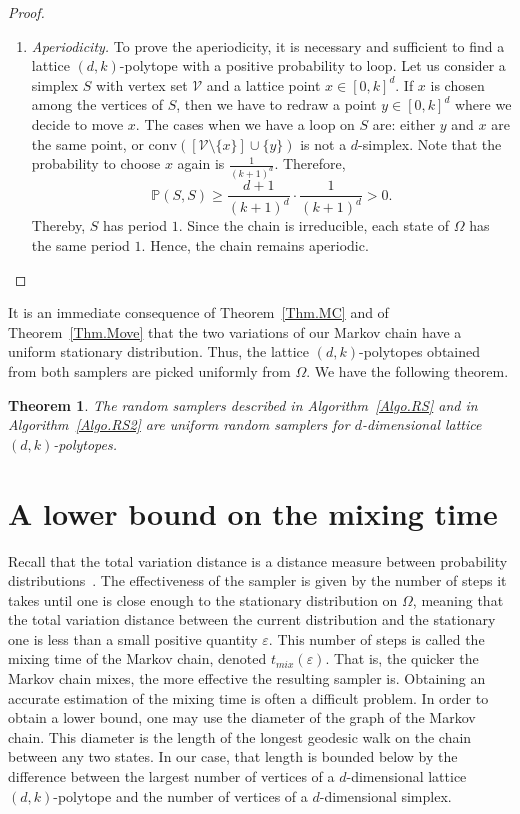 \documentclass[a4paper]{article}
\newtheorem{theorem}{Theorem}
\begin{document}
\begin{proof}
\begin{enumerate}[i]
    \item \textit{Aperiodicity.}
    To prove the aperiodicity, it is necessary and sufficient to find a lattice $(d,k)$-polytope with a positive probability to loop. Let us consider a simplex $S$ with vertex set $\mathcal{V}$ and a lattice point $x \in [0,k]^d$. If $x$ is chosen among the vertices of $S$, then we have to redraw a point $y\in [0,k]^d$ where we decide to move $x$. The cases when we have a loop on $S$ are: either $y$ and $x$ are the same point, or $\mathrm{conv}([\mathcal{V}\mathord{\setminus}\{x\}]\cup\{y\})$ is not a $d$-simplex. Note that the probability to choose $x$ again is $\frac{1}{(k+1)^d}$.
    Therefore,
    $$
      \mathbb{P}(S,S)\geq{\frac{d+1}{(k+1)^d}\cdot\frac{1}{(k+1)^d}}>0.
    $$
    Thereby, $S$ has period $1$. Since the chain is irreducible, each state of $\Omega$ has the same period $1$. Hence, the chain remains aperiodic.
  \end{enumerate}
\end{proof}

It is an immediate consequence of Theorem~\ref{Thm.MC} and of Theorem~\ref{Thm.Move} that the two variations of our Markov chain have a uniform stationary distribution. Thus, the lattice $(d,k)$-polytopes obtained from both samplers are picked uniformly from $\Omega$. We have the following theorem.

\begin{theorem}\label{Thm.RS}
  The random samplers described in Algorithm~\ref{Algo.RS} and in Algorithm~\ref{Algo.RS2} are uniform random samplers for $d$-dimensional lattice $(d,k)$-polytopes.
\end{theorem}

\section{A lower bound on the mixing time}\label{Sec.Mix}

Recall that the total variation distance is a distance measure between probability distributions~\cite{levin2009markov}.
The effectiveness of the sampler is given by the number of steps it takes until one is close enough to the stationary distribution on $\Omega$, meaning that the total variation distance between the current distribution
and the stationary one is less than a small positive quantity $\varepsilon$. This number of steps is called the mixing time of the Markov chain, denoted $t_{mix}(\varepsilon)$. That is, the quicker the Markov chain mixes, the more effective the resulting sampler is. Obtaining an accurate estimation of the mixing time is often a difficult problem. In order to obtain a lower bound, one may use the diameter of the graph of the Markov chain. This diameter is the length of the longest geodesic walk on the chain between any two states.
In our case, that length is bounded below by the difference between the largest number of vertices of a $d$-dimensional lattice $(d,k)$-polytope and the number of vertices of a $d$-dimensional simplex.
\end{document}
